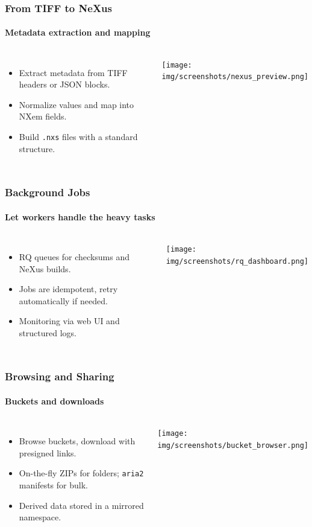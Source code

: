 \documentclass{beamer}
\begin{document}
	\begin{frame}
		\frametitle{From TIFF to NeXus}
		\framesubtitle{Metadata extraction and mapping}
		\begin{columns}[T,totalwidth=\textwidth]
			\begin{itemize}
				\item Extract metadata from TIFF headers or JSON blocks.
				\item Normalize values and map into NXem fields.
				\item Build \texttt{.nxs} files with a standard structure.
			\end{itemize}
			\texttt{[image: img/screenshots/nexus\_preview.png]}
		\end{columns}
	\end{frame}
	
	\begin{frame}
		\frametitle{Background Jobs}
		\framesubtitle{Let workers handle the heavy tasks}
		\begin{columns}[T,totalwidth=\textwidth]
			\column{0.52\textwidth}
			\begin{itemize}
				\item RQ queues for checksums and NeXus builds.
				\item Jobs are idempotent, retry automatically if needed.
				\item Monitoring via web UI and structured logs.
			\end{itemize}
			\column{0.48\textwidth}
			\texttt{[image: img/screenshots/rq\_dashboard.png]}
		\end{columns}
	\end{frame}
	
	\begin{frame}
		\frametitle{Browsing and Sharing}
		\framesubtitle{Buckets and downloads}
		\begin{columns}[T,totalwidth=\textwidth]
			\column{0.55\textwidth}
			\begin{itemize}
				\item Browse buckets, download with presigned links.
				\item On-the-fly ZIPs for folders; \texttt{aria2} manifests for bulk.
				\item Derived data stored in a mirrored namespace.
			\end{itemize}
			\column{0.45\textwidth}
			\texttt{[image: img/screenshots/bucket\_browser.png]}
		\end{columns}
	\end{frame}
	
\end{document}
